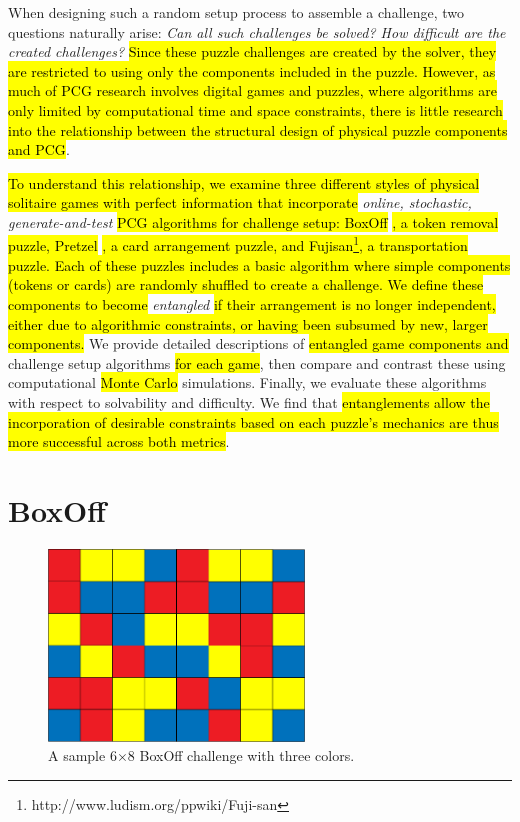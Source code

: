 \documentclass[journal]{IEEEtran}
\begin{document}
When designing such a random setup process to assemble a challenge, two questions naturally arise: {\it Can all such challenges be solved? How difficult are the created challenges? } \hl{Since these puzzle challenges are created by the solver, they are restricted to using only the components included in the puzzle. However, as much of PCG research involves digital games and puzzles, where algorithms are only limited by computational time and space constraints, there is little research into the relationship between the structural design of physical puzzle components and PCG}. 

\hl{To understand this relationship, we examine three different styles of physical solitaire games with perfect information that incorporate} {\it online, stochastic, generate-and-test} \hl{PCG algorithms for challenge setup: BoxOff} \cite{BoxOffGAMES} \hl{, a token removal puzzle, Pretzel} \cite{de1981pretzel} \hl{, a card arrangement puzzle, and Fujisan\footnote{http://www.ludism.org/ppwiki/Fuji-san}, a transportation puzzle. Each of these puzzles includes a basic algorithm where simple components (tokens or cards) are randomly shuffled to create a challenge. We define these components to become} {\it entangled} \hl{if their arrangement is no longer independent, either due to algorithmic constraints, or having been subsumed by new, larger components.} We provide detailed descriptions of \hl{entangled game components and} challenge setup algorithms \hl{for each game}, then compare and contrast these using computational \hl{Monte Carlo} simulations. Finally, we evaluate these algorithms with respect to solvability and difficulty. We find that \hl{entanglements allow the incorporation of desirable constraints based on each puzzle's mechanics are thus more successful across both metrics}.


\section{BoxOff}

\begin{figure}[t]
\centering
\includegraphics[width=6.8cm]{boxoff6x82.png}
\caption{A sample 6$\times$8 BoxOff challenge with three colors.}
\label{fig:boxoffbig}
\end{figure}
\end{document}

